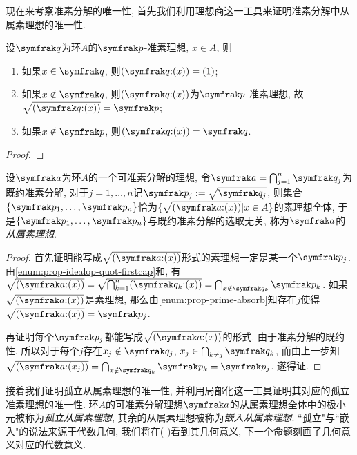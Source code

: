 现在来考察准素分解的唯一性, 首先我们利用理想商这一工具来证明准素分解中从属素理想的唯一性.

\begin{proposition}\label{prop:idealquotprimary}
    设$\ideal{q}$为环$A$的$\ideal{p}$-准素理想, $x\in A$, 则
    \begin{enumerate}
        \item 如果$x\in \ideal{q}$, 则$(\ideal{q}{:}(x))=(1)$;
        \item 如果$x\notin\ideal{q}$, 则$(\ideal{q}{:}(x))$为$\ideal{p}$-准素理想, 故$\sqrt{(\ideal{q}{:}(x))}=\ideal{p}$;
        \item 如果$x\notin\ideal{p}$, 则$(\ideal{q}{:}(x))=\ideal{q}$.
    \end{enumerate}
\end{proposition}

\begin{proof}
\end{proof}

\begin{theorem}\label{prop:primuniq1}
    设$\ideal{a}$为环$A$的一个可准素分解的理想, 令$\ideal{a}=\bigcap_{j=1}^n \ideal{q}_j$为既约准素分解, 对于$j=1, \dotsc, n$记$\ideal{p}_j:=\sqrt{\ideal{q}_j}$, 则集合$\{\ideal{p}_1, \dotsc, \ideal{p}_n\}$恰为$\{\sqrt{(\ideal{a}{:}(x))}\vert x\in A\}$的素理想全体, 于是$\{\ideal{p}_1, \dotsc, \ideal{p}_n\}$与既约准素分解的选取无关, 称为$\ideal{a}$的\emph{从属素理想}.
\end{theorem}

\begin{proof}
    首先证明能写成$\sqrt{(\ideal{a}{:}(x))}$形式的素理想一定是某一个$\ideal{p}_j$. 由\ref{enum:prop-idealop-quot-firstcap}和, 有$\sqrt{(\ideal{a}{:}(x))}=\sqrt{\bigcap_{k=1}^n(\ideal{q}_k{:}(x))}=\bigcap_{x\notin\ideal{q}_k}\ideal{p}_k$. 如果$\sqrt{(\ideal{a}{:}(x))}$是素理想, 那么由\ref{enum:prop-prime-absorb}知存在$j$使得$\sqrt{(\ideal{a}{:}(x))}=\ideal{p}_j$.

    再证明每个$\ideal{p}_j$都能写成$\sqrt{(\ideal{a}{:}(x))}$的形式. 由于准素分解的既约性, 所以对于每个$j$存在$x_j\notin\ideal{q}_j$, $x_j\in\bigcap_{k\neq j}\ideal{q}_k$, 而由上一步知$\sqrt{(\ideal{a}{:}(x_j))}=\bigcap_{x\notin\ideal{q}_k}\ideal{p}_k=\ideal{p}_j$. 遂得证.
\end{proof}

接着我们证明孤立从属素理想的唯一性, 并利用局部化这一工具证明其对应的孤立准素理想的唯一性. 环$A$的可准素分解理想$\ideal{a}$的从属素理想全体中的极小元被称为\emph{孤立从属素理想}, 其余的从属素理想被称为\emph{嵌入从属素理想}. ``孤立"与``嵌入"的说法来源于代数几何, 我们将在(%
)看到其几何意义, 下一个命题刻画了几何意义对应的代数意义.

